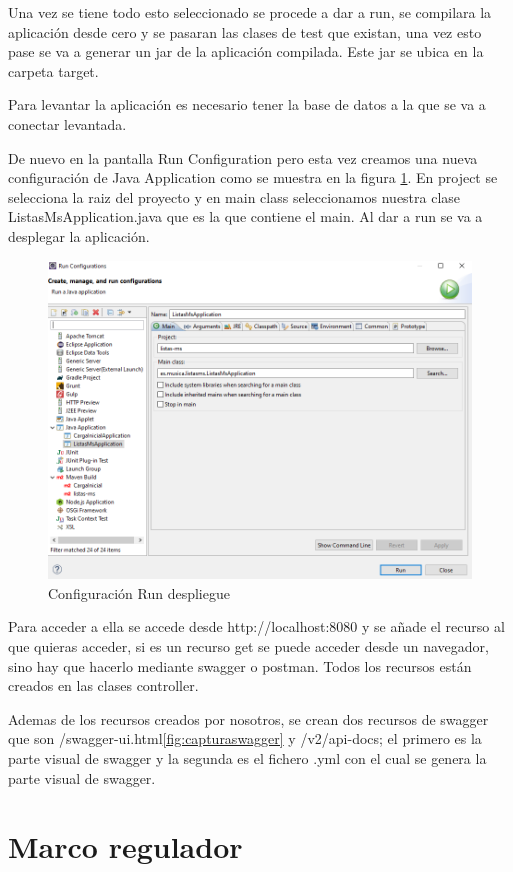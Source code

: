 \documentclass[12pt]{report} %
\begin{document}
Una vez se tiene todo esto seleccionado se procede a dar a run, se compilara la aplicación desde cero y se pasaran las clases de test que existan, una vez esto pase se va a generar un jar de la aplicación compilada. Este jar se ubica en la carpeta target.

Para levantar la aplicación es necesario tener la base de datos a la que se va a conectar levantada.

De nuevo en la pantalla Run Configuration pero esta vez creamos una nueva configuración de Java Application como se muestra en la figura \ref{fig:configuraciondespliegue}. En project se selecciona la raiz del proyecto y en main class seleccionamos nuestra clase ListasMsApplication.java que es la que contiene el main. Al dar a run se va a desplegar la aplicación. 

\begin{figure}
	\centering
	\includegraphics[width=0.7\linewidth]{imagenes/configuracionDespliegue}
	\caption{Configuración Run despliegue}
	\label{fig:configuraciondespliegue}
\end{figure}

Para acceder a ella se accede desde http://localhost:8080 y se añade el recurso al que quieras acceder, si es un recurso get se puede acceder desde un navegador, sino hay que hacerlo mediante swagger o postman. Todos los recursos están creados en las clases controller.

Ademas de los recursos creados por nosotros, se crean dos recursos de swagger que son /swagger-ui.html\ref{fig:capturaswagger} y /v2/api-docs; el primero es la parte visual de swagger y la segunda es el fichero .yml con el cual se genera la parte visual de swagger.
 
\chapter{Marco regulador}
\end{document}
